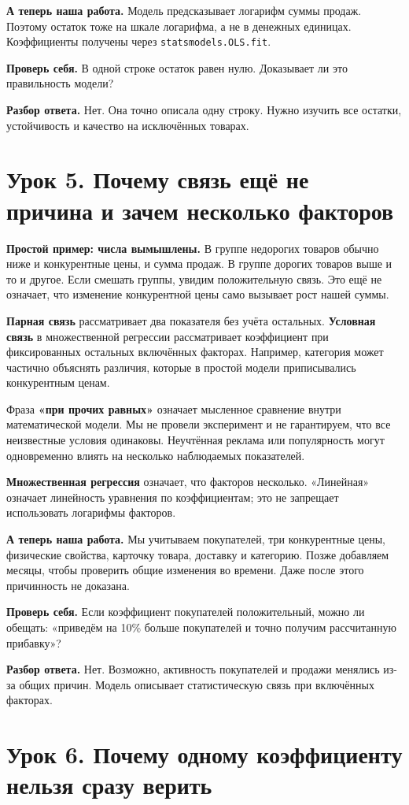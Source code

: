 \documentclass[12pt,a4paper]{article}
\newcommand{\toy}[1]{\par\textbf{Простой пример: числа вымышлены.} #1\par}
\newcommand{\ours}[1]{\par\textbf{А теперь наша работа.} #1\par}
\newcommand{\check}[2]{\par\textbf{Проверь себя.} #1\par\textbf{Разбор ответа.} #2\par}
\begin{document}
\ours{Модель предсказывает логарифм суммы продаж. Поэтому остаток тоже на шкале логарифма, а не в денежных единицах. Коэффициенты получены через \texttt{statsmodels.OLS.fit}.}

\check{В одной строке остаток равен нулю. Доказывает ли это правильность модели?}{Нет. Она точно описала одну строку. Нужно изучить все остатки, устойчивость и качество на исключённых товарах.}

\section{Урок 5. Почему связь ещё не причина и зачем несколько факторов}

\toy{В группе недорогих товаров обычно ниже и конкурентные цены, и сумма продаж. В группе дорогих товаров выше и то и другое. Если смешать группы, увидим положительную связь. Это ещё не означает, что изменение конкурентной цены само вызывает рост нашей суммы.}

\textbf{Парная связь} рассматривает два показателя без учёта остальных. \textbf{Условная связь} в множественной регрессии рассматривает коэффициент при фиксированных остальных включённых факторах. Например, категория может частично объяснять различия, которые в простой модели приписывались конкурентным ценам.

Фраза \textbf{«при прочих равных»} означает мысленное сравнение внутри математической модели. Мы не провели эксперимент и не гарантируем, что все неизвестные условия одинаковы. Неучтённая реклама или популярность могут одновременно влиять на несколько наблюдаемых показателей.

\textbf{Множественная регрессия} означает, что факторов несколько. «Линейная» означает линейность уравнения по коэффициентам; это не запрещает использовать логарифмы факторов.

\ours{Мы учитываем покупателей, три конкурентные цены, физические свойства, карточку товара, доставку и категорию. Позже добавляем месяцы, чтобы проверить общие изменения во времени. Даже после этого причинность не доказана.}

\check{Если коэффициент покупателей положительный, можно ли обещать: «приведём на 10\% больше покупателей и точно получим рассчитанную прибавку»?}{Нет. Возможно, активность покупателей и продажи менялись из-за общих причин. Модель описывает статистическую связь при включённых факторах.}

\section{Урок 6. Почему одному коэффициенту нельзя сразу верить}
\end{document}
